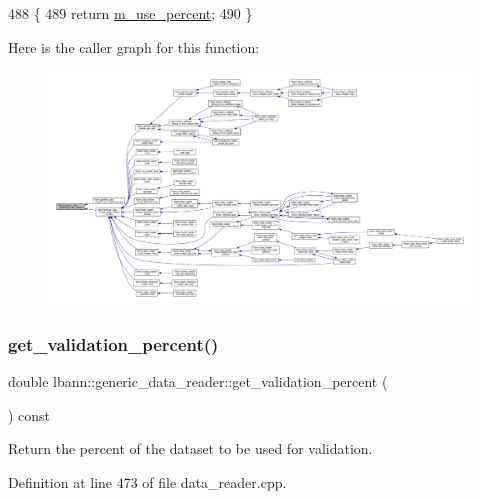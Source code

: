 \begin{DoxyCode}
488                                                   \{
489   \textcolor{keywordflow}{return} \hyperlink{classlbann_1_1generic__data__reader_a8b475834bd80e7103c3631d2b061aabc}{m\_use\_percent};
490 \}
\end{DoxyCode}
Here is the caller graph for this function\+:\nopagebreak
\begin{figure}[H]
\begin{center}
\leavevmode
\includegraphics[width=350pt]{classlbann_1_1generic__data__reader_a5853fa5e619b886699954aca6440dd8a_icgraph}
\end{center}
\end{figure}
\mbox{\label{classlbann_1_1generic__data__reader_ab06058b5fa1d74239998358b02f73132}} 
\subsubsection{\texorpdfstring{get\+\_\+validation\+\_\+percent()}{get\_validation\_percent()}}
{\footnotesize\ttfamily double lbann\+::generic\+\_\+data\+\_\+reader\+::get\+\_\+validation\+\_\+percent (\begin{DoxyParamCaption}{ }\end{DoxyParamCaption}) const\hspace{0.3cm}{\ttfamily [protected]}}

Return the percent of the dataset to be used for validation. 

Definition at line 473 of file data\+\_\+reader.\+cpp.


